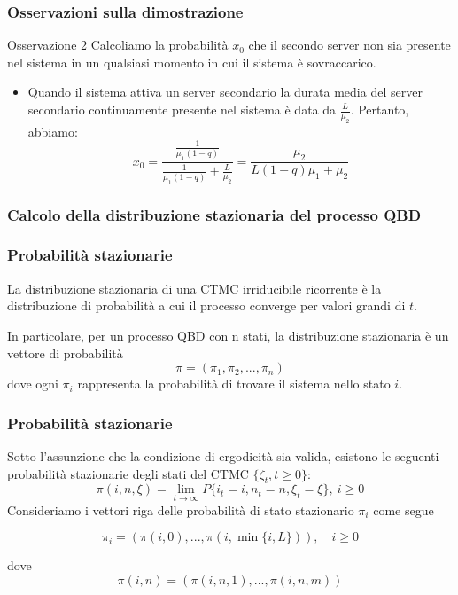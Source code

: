 \documentclass{beamer}
\begin{document}
\begin{frame}
    \frametitle{Osservazioni sulla dimostrazione}
    \begin{block}{Osservazione 2}
        Calcoliamo la probabilità $x_0$ che il secondo server non sia presente nel sistema in un qualsiasi momento in cui il sistema è sovraccarico.

        \begin{itemize}
            \item  Quando il sistema attiva un server secondario la durata media del server secondario continuamente presente nel sistema è data da $\frac{L}{\mu_2}$. Pertanto, abbiamo:
            \begin{equation*}
                x_0  = \frac{\frac{1}{\mu_1(1-q)}}{\frac{1}{\mu_1(1-q)} + \frac{L}{\mu_2}} = \frac{\mu_2}{L(1-q)\mu_1 + \mu_2}
            \end{equation*}
        \end{itemize}
    \end{block}
\end{frame}

\subsubsection{Calcolo della distribuzione stazionaria del processo QBD}

\begin{frame}
    \frametitle{Probabilità stazionarie}
    \begin{block}{}
         \begin{center}
            La distribuzione stazionaria di una CTMC irriducibile ricorrente è la distribuzione di probabilità a cui il processo converge per valori grandi di $t$.
         \end{center}
    \end{block}
    In particolare, per un processo QBD con n stati, la distribuzione stazionaria è un vettore di probabilità
    $$\pi = (\pi_1, \pi_2, ..., \pi_n)$$
    dove ogni $\pi_i$ rappresenta la probabilità di trovare il sistema nello stato $i$.
\end{frame}


\begin{frame}
    \frametitle{Probabilità stazionarie}
    Sotto l'assunzione che la condizione di ergodicità sia valida, esistono le seguenti probabilità stazionarie degli stati del CTMC $\{\zeta_t, t \geq 0\}$:
    $$\pi(i,n,\xi) = \lim_{t \to \infty} P\{i_t = i, n_t = n, \xi_t = \xi\}, ~ i \geq 0$$
    Consideriamo i vettori riga delle probabilità di stato stazionario $\pi_i$ come segue
    \begin{block}{}
        $$\pi_i = (\pi(i,0), ..., \pi(i, \min \{i,L\})), \quad i \geq 0$$
    \end{block}
    dove
    $$\pi(i,n) = (\pi(i,n,1), ..., \pi(i,n,m))$$
\end{frame}
\end{document}
